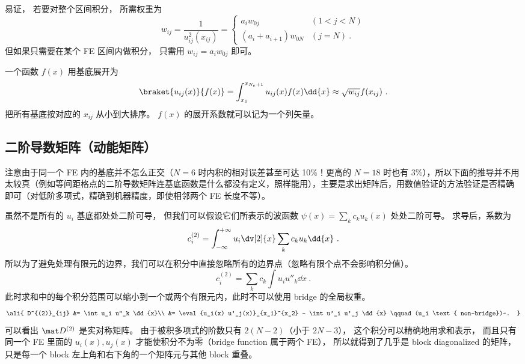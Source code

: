 易证， 若要对整个区间积分， 所需权重为
\begin{equation}
w_{ij} = \frac{1}{u_{ij}^2(x_{ij})} =
\begin{cases}
a_i w_{0j} &(1 < j < N) \\
(a_i + a_{i+1}) w_{0N} &(j = N)~.
\end{cases}
\end{equation}
但如果只需要在某个 FE 区间内做积分， 只需用 $w_{ij} = a_i w_{0j}$ 即可。

一个函数 $f(x)$ 用基底展开为
\begin{equation}
\braket{u_{ij}(x)}{f(x)} = \int_{x_1}^{x_{N_e+1}} u_{ij}(x) f(x) \dd{x} \approx \sqrt{w_{ij}} f(x_{ij})~.
\end{equation}
把所有基底按对应的 $x_{ij}$ 从小到大排序。 $f(x)$ 的展开系数就可以记为一个列矢量。

\subsection{二阶导数矩阵（动能矩阵）}
注意由于同一个 FE 内的基底并不怎么正交（$N=6$ 时内积的相对误差甚至可达 10\%！更高的 $N=18$ 时也有 3\%），所以下面的推导并不用太较真（例如等间距格点的二阶导数矩阵连基底函数是什么都没有定义，照样能用），主要是求出矩阵后，用数值验证的方法验证是否精确即可（对低阶多项式，精确到机器精度，即使相邻两个 FE 长度不等）。

虽然不是所有的 $u_i$ 基底都处处二阶可导， 但我们可以假设它们所表示的波函数 $\psi(x) = \sum_k c_k u_k(x)$ 处处二阶可导。 求导后，系数为
\begin{equation}
c_i^{(2)} = \int_{-\infty}^{+\infty} {u_i}\dv[2]{x}\sum_k c_k u_k \dd{x}~.
\end{equation}
所以为了避免处理有限元的边界，我们可以在积分中直接忽略所有的边界点（忽略有限个点不会影响积分值）。
\begin{equation}
c_i^{(2)} = \sum_k c_k \int u_i u''_k \dd{x}~.
\end{equation}
此时求和中的每个积分范围可以缩小到一个或两个有限元内，此时不可以使用 bridge 的全局权重。
\begin{equation}\ali{
D^{(2)}_{ij} &= \int u_i u''_k \dd{x}\\
&= \eval{u_i(x) u'_j(x)}_{x_1}^{x_2} - \int u'_i u'_j \dd{x} \qquad (u_i \text{ non-bridge})~.
}\end{equation}
可以看出 $\mat D^{(2)}$ 是实对称矩阵。 由于被积多项式的阶数只有 $2(N-2)$（小于 $2N-3$）， 这个积分可以精确地用求和表示， 而且只有同一个 FE 里面的 $u_i(x), u_j(x)$ 才能使积分不为零（bridge function 属于两个 FE）， 所以就得到了几乎是 block diagonalized 的矩阵， 只是每一个 block 左上角和右下角的一个矩阵元与其他 block 重叠。

